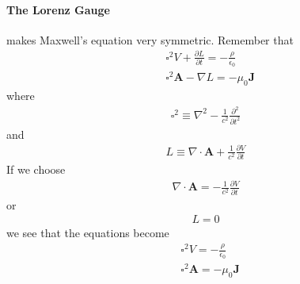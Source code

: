 \paragraph{The Lorenz Gauge} makes Maxwell's equation very symmetric. Remember that \begin{align*}
    &\square^{2} V + \frac{\partial L}{\partial t} = -\frac{\rho}{\epsilon _0}\\
    &\square^{2} \mathbf{A} - \nabla L = -\mu _0 \mathbf{J}
\end{align*}
where \begin{align*}
    \square^{2} \equiv \nabla ^{2} - \frac{1}{c^{2} } \frac{\partial^{2} }{\partial t^{2} } 
\end{align*}
and \begin{align*}
    L \equiv \nabla \cdot \mathbf{A} + \frac{1}{c^{2} }\frac{\partial V}{\partial t} 
\end{align*} 
If we choose \begin{align*}
    \nabla \cdot \mathbf{A} = - \frac{1}{c^{2} } \frac{\partial V}{\partial t} 
\end{align*}
or \begin{align*}
    L = 0
\end{align*}
we see that the equations become  \begin{align*}
    &\square ^{2} V = -\frac{\rho}{\epsilon_0}\\
    &\square^{2} \mathbf{A} = -\mu _0 \mathbf{J}
\end{align*}

